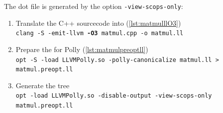 The dot file is generated by the option \texttt{-view-scops-only}:
\begin{enumerate}
    \item Translate the C++ sourcecode into \llvmir (\autoref{lst:matmulllO3})\\
        \texttt{clang -S -emit-llvm \textbf{-O3} matmul.cpp -o matmul.ll}
    \item Prepare the \llvmir for Polly (\autoref{lst:matmulpreoptll})\\
        \texttt{opt -S -load LLVMPolly.so -polly-canonicalize matmul.ll > matmul.preopt.ll}
    \item Generate the \scop tree\\
        \texttt{opt -load LLVMPolly.so -disable-output -view-scops-only matmul.preopt.ll}
\end{enumerate}

